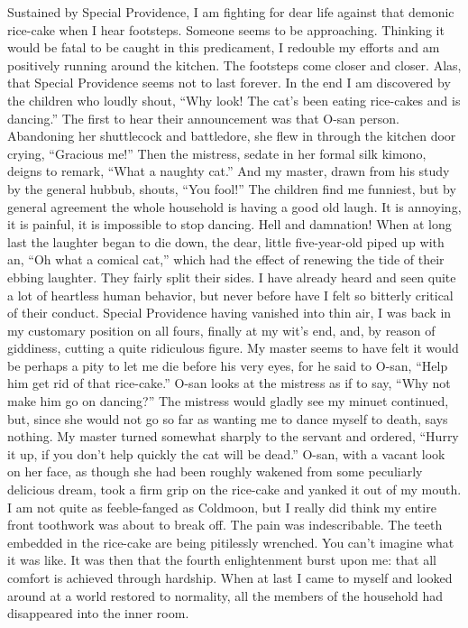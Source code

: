 \documentclass{book}
\begin{document}
Sustained by Special Providence, I am fighting for dear life against
that demonic rice-cake when I hear footsteps. Someone seems to be
approaching. Thinking it would be fatal to be caught in this
predicament, I redouble my efforts and am positively running around the
kitchen. The footsteps come closer and closer. Alas, that Special
Providence seems not to last forever. In the end I am discovered by the
children who loudly shout, ``Why look! The cat's been eating rice-cakes
and is dancing.'' The first to hear their announcement was that O-san
person. Abandoning her shuttlecock and battledore, she flew in through
the kitchen door crying, ``Gracious me!'' Then the mistress, sedate in
her formal silk kimono, deigns to remark, ``What a naughty cat.'' And my
master, drawn from his study by the general hubbub, shouts, ``You
fool!'' The children find me funniest, but by general agreement the
whole household is having a good old laugh. It is annoying, it is
painful, it is impossible to stop dancing. Hell and damnation! When at
long last the laughter began to die down, the dear, little five-year-old
piped up with an, ``Oh what a comical cat,'' which had the effect of
renewing the tide of their ebbing laughter. They fairly split their
sides. I have already heard and seen quite a lot of heartless human
behavior, but never before have I felt so bitterly critical of their
conduct. Special Providence having vanished into thin air, I was back in
my customary position on all fours, finally at my wit's end, and, by
reason of giddiness, cutting a quite ridiculous figure. My master seems
to have felt it would be perhaps a pity to let me die before his very
eyes, for he said to O-san, ``Help him get rid of that rice-cake.''
O-san looks at the mistress as if to say, ``Why not make him go on
dancing?'' The mistress would gladly see my minuet continued, but, since
she would not go so far as wanting me to dance myself to death, says
nothing. My master turned somewhat sharply to the servant and ordered,
``Hurry it up, if you don't help quickly the cat will be dead.'' O-san,
with a vacant look on her face, as though she had been roughly wakened
from some peculiarly delicious dream, took a firm grip on the rice-cake
and yanked it out of my mouth. I am not quite as feeble-fanged as
Coldmoon, but I really did think my entire front toothwork was about to
break off. The pain was indescribable. The teeth embedded in the
rice-cake are being pitilessly wrenched. You can't imagine what it was
like. It was then that the fourth enlightenment burst upon me: that all
comfort is achieved through hardship. When at last I came to myself and
looked around at a world restored to normality, all the members of the
household had disappeared into the inner room.
\end{document}
